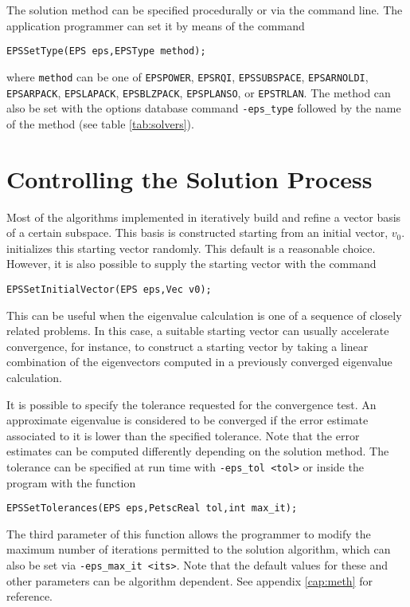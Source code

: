 The solution method can be specified procedurally or via the command line. The application programmer can set it by means of the command
	\begin{Verbatim}[fontsize=\small]
	EPSSetType(EPS eps,EPSType method);
	\end{Verbatim}
where \texttt{method} can be one of 
\texttt{EPSPOWER}, 
\texttt{EPSRQI},
\texttt{EPSSUBSPACE},
\texttt{EPSARNOLDI},
\texttt{EPSARPACK},
\texttt{EPSLAPACK},
\texttt{EPSBLZPACK},
\texttt{EPSPLANSO}, or
\texttt{EPSTRLAN}.
The  method can also be set with the options database command \Verb!-eps_type! followed by the name of the method (see table \ref{tab:solvers}).

\section{Controlling the Solution Process}

	Most of the algorithms implemented in \slepc iteratively build and refine a vector basis of a certain subspace. This basis is constructed starting from an initial vector, $v_0$.  initializes this starting vector randomly. This default is a reasonable choice. However, it is also possible to supply the starting vector with the command
	\begin{Verbatim}[fontsize=\small]
	EPSSetInitialVector(EPS eps,Vec v0);
	\end{Verbatim}
This can be useful when the eigenvalue calculation is one of a sequence of closely related problems. In this case, a suitable starting vector can usually accelerate convergence, for instance, to construct a starting vector by taking a linear combination of the eigenvectors computed in a previously converged eigenvalue calculation.

	It is possible to specify the tolerance requested for the convergence test. An approximate eigenvalue is considered to be converged if the error estimate associated to it is lower than the specified tolerance. Note that the error estimates can be computed differently depending on the solution method. The tolerance can be specified at run time with \Verb!-eps_tol <tol>! or inside the program with the function
	\begin{Verbatim}[fontsize=\small]
	EPSSetTolerances(EPS eps,PetscReal tol,int max_it);
	\end{Verbatim}
	The third parameter of this function allows the programmer to modify the maximum number of iterations permitted to the solution algorithm, which can also be set via \Verb!-eps_max_it <its>!. Note that the default values for these and other parameters can be algorithm dependent. See appendix \ref{cap:meth} for reference.

